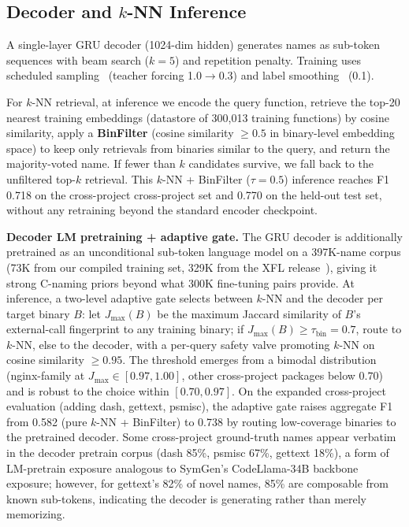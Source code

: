 \documentclass[sigconf,nonacm]{acmart}
\begin{document}
\subsection{Decoder and $k$-NN Inference}

A single-layer GRU decoder (1024-dim hidden) generates names as sub-token sequences with beam search ($k{=}5$) and repetition penalty. Training uses scheduled sampling~\cite{bengio2015scheduled} (teacher forcing 1.0$\to$0.3) and label smoothing~\cite{labelsmooth} (0.1).

For $k$-NN retrieval, at inference we encode the query function, retrieve the top-20 nearest training embeddings (datastore of 300{,}013 training functions) by cosine similarity, apply a \textbf{BinFilter} (cosine similarity $\geq 0.5$ in binary-level embedding space) to keep only retrievals from binaries similar to the query, and return the majority-voted name. If fewer than $k$ candidates survive, we fall back to the unfiltered top-$k$ retrieval. This $k$-NN + BinFilter ($\tau{=}0.5$) inference reaches F1 0.718 on the cross-project cross-project set and 0.770 on the held-out test set, without any retraining beyond the standard encoder checkpoint.

\textbf{Decoder LM pretraining + adaptive gate.} The GRU decoder is additionally pretrained as an unconditional sub-token language model on a 397K-name corpus (73K from our compiled training set, 329K from the XFL release~\cite{xfl}), giving it strong C-naming priors beyond what 300K fine-tuning pairs provide. At inference, a two-level adaptive gate selects between $k$-NN and the decoder per target binary $B$: let $J_{\max}(B)$ be the maximum Jaccard similarity of $B$'s external-call fingerprint to any training binary; if $J_{\max}(B) \ge \tau_{\text{bin}}{=}0.7$, route to $k$-NN, else to the decoder, with a per-query safety valve promoting $k$-NN on cosine similarity $\ge 0.95$. The threshold emerges from a bimodal distribution (nginx-family at $J_{\max} \in [0.97, 1.00]$, other cross-project packages below $0.70$) and is robust to the choice within $[0.70, 0.97]$. On the expanded cross-project evaluation (adding dash, gettext, psmisc), the adaptive gate raises aggregate F1 from 0.582 (pure $k$-NN + BinFilter) to 0.738 by routing low-coverage binaries to the pretrained decoder. Some cross-project ground-truth names appear verbatim in the decoder pretrain corpus (dash 85\%, psmisc 67\%, gettext 18\%), a form of LM-pretrain exposure analogous to SymGen's CodeLlama-34B backbone exposure; however, for gettext's 82\% of novel names, 85\% are composable from known sub-tokens, indicating the decoder is generating rather than merely memorizing.
\end{document}
